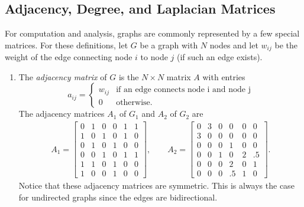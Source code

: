 \subsection*{Adjacency, Degree, and Laplacian Matrices} %

For computation and analysis, graphs are commonly represented by a few special matrices.
For these definitions, let $G$ be a graph with $N$ nodes and let $w_{ij}$ be the weight of the edge connecting node $i$ to node $j$ (if such an edge exists).
%
\begin{enumerate}
\item The \emph{adjacency matrix} of $G$ is the $N\times N$ matrix $A$ with entries
\[
a_{ij} =
\begin{cases}
w_{ij} & \text{if an edge connects node i and node j} \\
0 & \text{otherwise.}
\end{cases}
\]
The adjacency matrices $A_1$ of $G_1$ and $A_2$ of $G_2$ are
\begin{align*}
A_1 = \left[\begin{array}{cccccc}
0 & 1 & 0 & 0 & 1 & 1\\
1 & 0 & 1 & 0 & 1 & 0\\
0 & 1 & 0 & 1 & 0 & 0\\
0 & 0 & 1 & 0 & 1 & 1\\
1 & 1 & 0 & 1 & 0 & 0\\
1 & 0 & 0 & 1 & 0 & 0
\end{array}\right],
\qquad A_2 =
\left[\begin{array}{cccccc}
0 & 3 & 0 & 0 & 0 & 0\\
3 & 0 & 0 & 0 & 0 & 0\\
0 & 0 & 0 & 1 & 0 & 0\\
0 & 0 & 1 & 0 & 2 & .5\\
0 & 0 & 0 & 2 & 0 & 1\\
0 & 0 & 0 & .5 & 1 & 0
\end{array}\right].
\end{align*}
Notice that these adjacency matrices are symmetric.
This is always the case for undirected graphs since the edges are bidirectional.

\end{enumerate}
